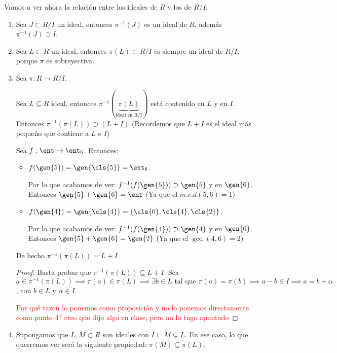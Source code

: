Vamos a ver ahora la relación entre los ideales de $R$ y los de $R/I$:
\begin{enumerate}
	\item Sea $J \subset R/I$ un ideal, entonces $\pi^{-1}(J)$ es un ideal de $R$, además $\pi^{-1}(J)\supset I$.
	\item Sea $L \subset R$ un ideal, entonces $\pi(L) \subset R/I$ es siempre un ideal de $R/I$, porque $\pi$ es sobreyectiva.
	\item Sea $\pi: R \rightarrow R/I$.

	Sea $L\subseteq R$ ideal, entonces $\pi^{-1}(\underbrace{\pi(L)}_{\text{ideal en R/I}})$ está contenido en $L$ y en $I$. Entonces $\pi^{-1}(\pi(L)) \supset (L+I)$ (Recordemos que $L+I$ es el ideal más pequeño que contiene a $L$ e $I$)
	\begin{example}
		Sea $f: \ent \rightarrow \ent_6$. Entonces:
		\begin{itemize}
			\item $f(\gen{5})=\gen{\cls{5}}=\ent_6$.

			Por lo que acabamos de ver: $f^{-1}(f(\gen{5})) \supset \gen{5}$ y en $\gen{6}$. Entonces $\gen{5} + \gen{6} = \ent$ (Ya que el $m.c.d(5,6)=1$)
			\item $f(\gen{4})=\gen{\cls{4}}=\{\cls{0},\cls{4},\cls{2} \}$.

			Por lo que acabamos de ver: $f^{-1}(f(\gen{4})) \supset \gen{4}$ y en $\gen{6}$. Entonces $\gen{5} + \gen{6} = \gen{2}$ (Ya que el $\gcd (4,6)=2$)
		\end{itemize}
	\end{example}

	\begin{prop}
		De hecho $\pi^{-1}(\pi(L)) = L+I$
	\end{prop}
	\begin{proof}
		Basta probar que $\pi^{-1}(\pi(L)) \subseteq L+I$. Sea $a \in \pi^{-1}(\pi(L)) \implies \pi(a) \in \pi(L) \implies \exists b\in L \text{ tal que } \pi(a)=\pi(b) \implies a-b \in I  \implies a=b+\alpha$, con $b \in L$ y $\alpha \in I$.

		\textcolor{red}{Por qué razon lo ponemos como proposición y no lo ponemos directamente como punto 4? creo que dijo algo en clase, pero no lo tngo apuntado}
	\end{proof}

	\item Supongamos que $L, M ⊂ R$ son ideales con $I ⊆ M \subsetneq L$. En ese caso, lo que querremos ver será la siguiente propiedad: $π(M) \subsetneq π(L)$.


\end{enumerate}
